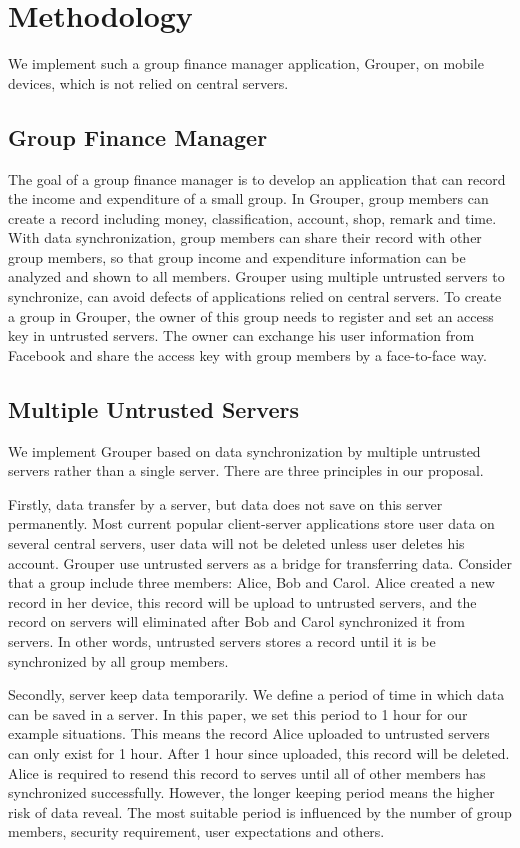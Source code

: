 \documentclass[twocolumn,10pt]{article}
\begin{document}
\section{Methodology}

We implement such a group finance manager application, Grouper, on mobile devices, which is not relied on central servers. 

\subsection{Group Finance Manager}
The goal of a group finance manager is to develop an application that can record the income and expenditure of a small group. In Grouper, group members can create a record including money, classification, account, shop, remark and time. With data synchronization, group members can share their record with other group members, so that group income and expenditure information can be analyzed and shown to all members. Grouper using multiple untrusted servers to synchronize, can avoid defects of applications relied on central servers. To create a group in Grouper, the owner of this group needs to register and set an access key in untrusted servers. The owner can exchange his user information from Facebook and share the access key with group members by a face-to-face way.

\subsection{Multiple Untrusted Servers}

We implement Grouper based on data synchronization by multiple untrusted servers rather than a single server. There are three principles in our proposal. 

Firstly, data transfer by a server, but data does not save on this server permanently. Most current popular client-server applications store user data on several central servers, user data will not be deleted unless user deletes his account. Grouper use untrusted servers as a bridge for transferring data. Consider that a group include three members: Alice, Bob and Carol. Alice created a new record in her device, this record will be upload to untrusted servers, and the record on servers will eliminated after Bob and Carol synchronized it from servers. In other words, untrusted servers stores a record until it is be synchronized by all group members.

Secondly, server keep data temporarily. We define a period of time in which data can be saved in a server. In this paper, we set this period to 1 hour for our example situations. This means the record Alice uploaded to untrusted servers can only exist for 1 hour. After 1 hour since uploaded, this record will be deleted. Alice is required to resend this record to serves until all of other members has synchronized successfully. However, the longer keeping period means the higher risk of data reveal. The most suitable period is influenced by the number of group members, security requirement, user expectations and others. 
\end{document}
